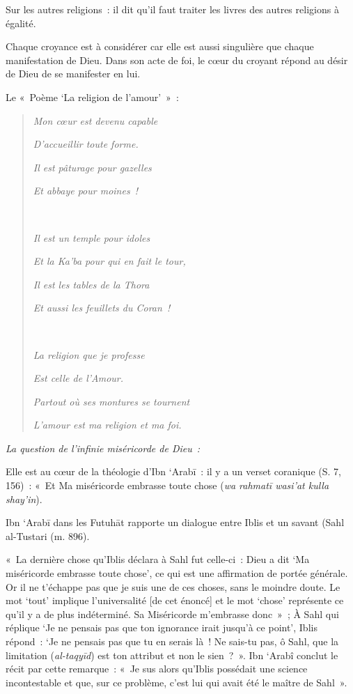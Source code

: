 Sur les autres religions~: il dit qu'il faut traiter les livres des
autres religions à égalité.

Chaque croyance est à considérer car elle est aussi singulière que
chaque manifestation de Dieu. Dans son acte de foi, le cœur du croyant
répond au désir de Dieu de se manifester en lui.

Le «~Poème `La religion de l'amour'~»~:

\begin{quote}
\emph{Mon cœur est devenu capable}

\emph{D'accueillir toute forme.}

\emph{Il est pâturage pour gazelles}

\emph{Et abbaye pour moines~!}

\emph{~}

\emph{Il est un temple pour idoles}

\emph{Et la Ka'ba pour qui en fait le tour,}

\emph{Il est les tables de la Thora}

\emph{Et aussi les feuillets du Coran~!}

\emph{~}

\emph{La religion que je professe}

\emph{Est celle de l'Amour.}

\emph{Partout où ses montures se tournent}

\emph{L'amour est ma religion et ma foi.}
\end{quote}

\emph{La question de l'infinie miséricorde de Dieu~:}

Elle est au cœur de la théologie d'Ibn `Arabī~: il y a un verset
coranique (S. 7, 156)~: «~Et Ma miséricorde embrasse toute chose
(\emph{wa rahmatī wasi'at kulla shay'in}).

Ibn `Arabī dans les Futuhāt rapporte un dialogue entre Iblis et un
savant (Sahl al-Tustari (m. 896).

«~La dernière chose qu'Iblis déclara à Sahl fut celle-ci~: Dieu a dit
`Ma miséricorde embrasse toute chose', ce qui est une affirmation de
portée générale. Or il ne t'échappe pas que je suis une de ces choses,
sans le moindre doute. Le mot `tout' implique l'universalité {[}de cet
énoncé{]} et le mot `chose' représente ce qu'il y a de plus indéterminé.
Sa Miséricorde m'embrasse donc~»~; À Sahl qui réplique `Je ne pensais
pas que ton ignorance irait jusqu'à ce point', Iblis répond~: `Je ne
pensais pas que tu en serais là~! Ne sais-tu pas, ô Sahl, que la
limitation (\emph{al-taqyīd}) est ton attribut et non le sien~?~». Ibn
`Arabî conclut le récit par cette remarque~: «~Je sus alors qu'Iblis
possédait une science incontestable et que, sur ce problème, c'est lui
qui avait été le maître de Sahl~».

